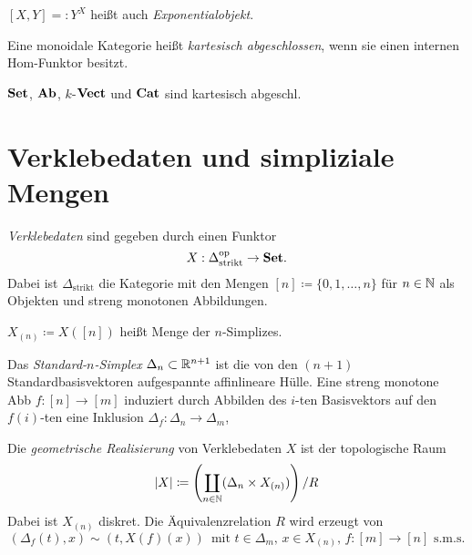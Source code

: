 \documentclass{cheat-sheet}
\begin{document}
\begin{nota}
  $[X, Y] =: Y^X$ heißt auch \emph{Exponentialobjekt}.
\end{nota}

\begin{defn}
  Eine monoidale Kategorie heißt \emph{kartesisch abgeschlossen}, wenn sie einen internen Hom-Funktor besitzt.
\end{defn}

\begin{bspe}
  $\mathbf{Set}$, $\mathbf{Ab}$, $k$-$\mathbf{Vect}$ und $\mathbf{Cat}$ sind kartesisch abgeschl.
\end{bspe}



\section{Verklebedaten und simpliziale Mengen}


\begin{defn}
  \emph{Verklebedaten} sind gegeben durch einen Funktor
  \[ X : \Delta_{\text{strikt}}^{\mathrm{op}} \to \mathbf{Set}. \]
  Dabei ist $\Delta_{\text{strikt}}$ die Kategorie mit den Mengen
  $[n] \coloneqq \{ 0, 1, \ldots, n \}$ für $n \in \mathbb{N}$ als Objekten und streng monotonen Abbildungen.
\end{defn}

\begin{nota}
  $X_{(n)} \coloneqq X([n])$ heißt Menge der $n$-Simplizes.
\end{nota}

\begin{defn}
  Das \emph{Standard-$n$-Simplex} $\Delta_n \subset \mathbb{R}^{n+1}$ ist die von den $(n{+}1)$ Standardbasisvektoren aufgespannte affinlineare Hülle. Eine streng monotone Abb $f : [n] \to [m]$ induziert durch Abbilden des $i$-ten Basisvektors auf den $f(i)$-ten eine Inklusion $\Delta_f : \Delta_n \to \Delta_m$, 
\end{defn}

\begin{defn}
  Die \emph{geometrische Realisierung} von Verklebedaten $X$ ist der topologische Raum
  \[ \lvert X\rvert \coloneqq \left( \coprod_{n \in \mathbb{N}} (\Delta_n \times X_{(n)}) \right) / R \]
  Dabei ist $X_{(n)}$ diskret. Die Äquivalenzrelation $R$ wird erzeugt von
  \[
    (\Delta_f(t), x) \sim (t, X(f)(x)) \enspace
    \text{mit $t \in \Delta_m$, $x \in X_{(n)}$, $f : [m] {\to} [n]$ s.m.s.}
  \]
\end{defn}
\end{document}
